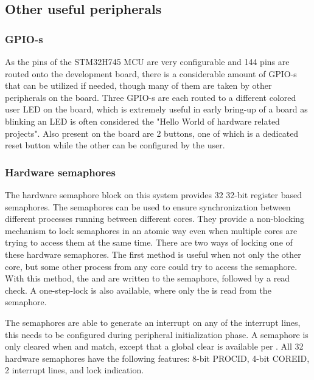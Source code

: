 \subsection{Other useful peripherals}

\subsubsection{GPIO-s}

As the pins of the STM32H745 MCU are very configurable and 144 pins are routed onto the development board, there is a considerable amount of GPIO-s that can be utilized if needed, though many of them are taken by other peripherals on the board. Three GPIO-s are each routed to a different colored user LED on the board, which is extremely useful in early bring-up of a board as blinking an LED is often considered the "Hello World of hardware related projects". Also present on the board are 2 buttons, one of which is a dedicated reset button while the other can be configured by the user.

\subsubsection{Hardware semaphores}

The hardware semaphore block on this system provides 32 32-bit register based semaphores. The semaphores can be used to ensure synchronization between different processes running between different cores. They provide a non-blocking mechanism to lock semaphores in an atomic way even when multiple cores are trying to access them at the same time. There are two ways of locking one of these hardware semaphores. The first method is useful when not only the other core, but some other process from any core could try to access the semaphore. With this method, the  and  are written to the semaphore, followed by a read check. A one-step-lock is also available, where only the  is read from the semaphore.

The semaphores are able to generate an interrupt on any of the interrupt lines, this needs to be configured during peripheral initialization phase. A semaphore is only cleared when  and  match, except that a global clear is available per . All 32 hardware semaphores have the following features: 8-bit PROCID, 4-bit COREID, 2 interrupt lines, and lock indication.

